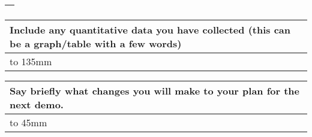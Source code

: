 \documentclass[a4paper]{article}
\newcommand{\colWidth}{141mm}
\begin{document}
\begin{center}
\begin{tabular}{|p{\colWidth}|}
{  }
  \\
  \hline
\end{tabular}
\vskip 5mm


\begin{tabular}{|p{\colWidth}|}
	\hline
	\cellcolor{blue!25}\large
	\textbf{Include any quantitative data you have collected (this can be a graph/table with a few words)}
	\\ \hline
	\vtop to 135mm{
  }
  \\
  \hline
\end{tabular}
\vskip 5mm


\begin{tabular}{|p{\colWidth}|}
	\hline
	\cellcolor{blue!25}\large
	\textbf{Say briefly what changes you will make to your plan for the next demo.}
	\\ \hline
	\vtop to 45mm{
  	}
  \\
  \hline
\end{tabular}

\end{center}
  
\end{document}
